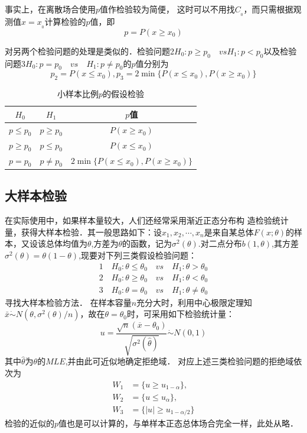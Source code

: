 事实上，在离散场合使用$p$值作检验较为简便， 这时可以不用找$C_{_0}$，而只需根据观测值$x=x_{_0}$计算检验的$p$值，即
$$
    p = P(x \geq x_0)
$$

对另两个检验问题的处理是类似的．检验问题2$H_0:p \geq p_0 \quad vs H_1:p<p_0$以及检验问题3$H_0:p=p_0 \quad vs \quad H_1:p \neq p_0$的$p$值分别为
$$
    p_2 = P(x \leq x_0),
    p_3 = 2\min\{P(x \leq x_0),P(x \geq x_0)\}
$$


\begin{table}[H]
    \centering
    \caption{小样本比例$p$的假设检验}
    \begin{tabular}{@{}ccc@{}}
    \toprule
   $H_0$ & $H_1$ &$p$值\\ 
   \midrule
   $p \leq p_0$  &  $p \geq p_0$ & $P(x \geq x_0)$ \\
   $p \geq p_0$ &  $p \leq p_0$ & $P(x\leq x_0)$ \\ 
   $p = p_0$&  $p \neq p_0$&$ 2 \min \{P(x\leq x_0),P(x \geq x_0)\}$ \\
   \bottomrule
    \end{tabular}
\end{table}
\subsection{大样本检验}
在实际使用中，如果样本量较大，人们还经常采用渐近正态分布构
造检验统计量，获得大样本检验．其一般思路如下：设$x_1,x_2,\cdots,x_n$是来自某总体$F(x;\theta)$的样本，又设该总体均值为$\theta$,方差为$\theta$的函数，记为$\sigma^2(\theta)$.对二点分布$b(1,\theta)$,其方差$\sigma^2(\theta)=\theta(1-\theta)$,现要对下列三类假设检验问题：
\begin{align}
    1\quad H_0:\theta \leq \theta_0 \quad vs \quad H_1:\theta > \theta_0 \\
    2\quad H_0:\theta \geq \theta_0 \quad vs \quad H_1:\theta < \theta_0 \\
    3\quad H_0:\theta = \theta_0 \quad vs \quad H_1:\theta \neq \theta_0
\end{align}
寻找大样本检验方法． 在样本容量$n$充分大时，利用中心极限定理知$\bar{x} \dot\sim N(\theta,\sigma^2(\theta)/n)$，故在$\theta=\theta_0$时，可采用如下检验统计量：
\begin{equation}
    u=\frac{\sqrt{n}\left(\overline{x}-\theta_{0}\right)}{\sqrt{\sigma^{2}(\hat{\theta})}}\dot{\sim}N(0,1)
\end{equation}
其中$\hat{\theta}$为$\theta$的$MLE$,并由此可近似地确定拒绝域． 对应上述三类检验问题的拒绝域依次为
$$
    \begin{aligned}
        W_1 & = \{u \geq u_{1-\alpha}\},      \\
        W_2 & = \{u \leq u_{\alpha}\},        \\
        W_3 & = \{|u| \geq u_{1- \alpha /2}\}
    \end{aligned}
$$
检验的近似的$p$值也是可以计算的，与单样本正态总体场合完全一样，此处从略．



